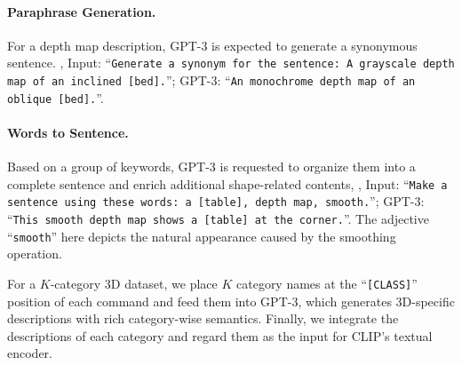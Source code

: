 \documentclass[10pt,twocolumn,letterpaper]{article}
\begin{document}
\vspace{-6pt}
\paragraph{Paraphrase Generation.} 
For a depth map description, GPT-3 is expected to generate a synonymous sentence. \eg, Input: ``\texttt{Generate a synonym for the sentence: A grayscale depth map of an inclined {[bed]}.}''; GPT-3: ``\texttt{An monochrome depth map of an oblique {[bed]}.}''.

\vspace{-6pt}
\paragraph{Words to Sentence.} 
Based on a group of keywords, GPT-3 is requested to organize them into a complete sentence and enrich additional shape-related contents, \eg, Input: ``\texttt{Make a sentence using these words: a {[table]}, depth map, smooth.}''; GPT-3: ``\texttt{This smooth depth map shows a {[table]} at the corner.}''. The adjective ``\texttt{smooth}'' here depicts the natural appearance caused by the smoothing operation.

\vspace{0.45cm}
For a $K$-category 3D dataset, we place $K$ category names at the ``\texttt{{[CLASS]}}'' position of each command and feed them into GPT-3, which generates 3D-specific descriptions with rich category-wise semantics. Finally, we integrate the descriptions of each category and regard them as the input for CLIP's textual encoder. 
\end{document}
